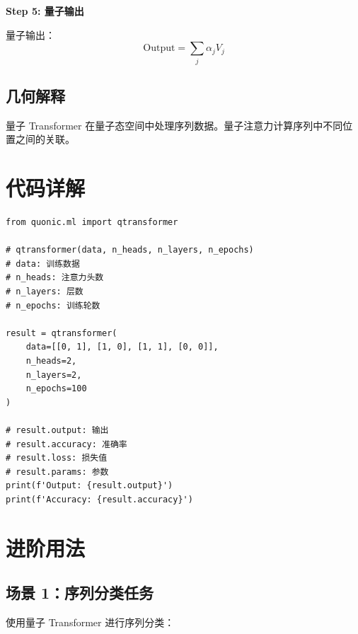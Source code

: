 \documentclass[12pt,a4paper]{article}
\begin{document}
\textbf{Step 5: 量子输出}

量子输出：
\begin{equation}
\text{Output} = \sum_j \alpha_j V_j
\end{equation}

\subsection{几何解释}

量子 Transformer 在量子态空间中处理序列数据。量子注意力计算序列中不同位置之间的关联。

\section{代码详解}

\begin{verbatim}
from quonic.ml import qtransformer

# qtransformer(data, n_heads, n_layers, n_epochs)
# data: 训练数据
# n_heads: 注意力头数
# n_layers: 层数
# n_epochs: 训练轮数

result = qtransformer(
    data=[[0, 1], [1, 0], [1, 1], [0, 0]],
    n_heads=2,
    n_layers=2,
    n_epochs=100
)

# result.output: 输出
# result.accuracy: 准确率
# result.loss: 损失值
# result.params: 参数
print(f'Output: {result.output}')
print(f'Accuracy: {result.accuracy}')
\end{verbatim}

\section{进阶用法}

\subsection{场景 1：序列分类任务}

使用量子 Transformer 进行序列分类：
\end{document}
